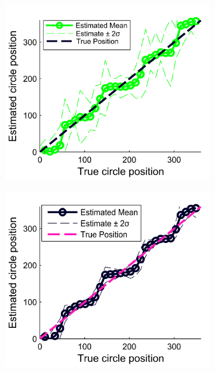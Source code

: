 \begin{figure}
\begin{subfigure}{7cm}
	\caption{}
	\label{Figure: circular_fusion_mean_5}	
	\end{subfigure}\\
	\begin{subfigure}{7cm}
	\includegraphics[scale=1]{line_circular_fusion_mean_10.png}
	\caption{}	
	\label{Figure: circular_fusion_mean_10}
	\end{subfigure}
	\begin{subfigure}{7cm}
	\includegraphics[scale=1]{line_circular_fusion_mean_40.png}

\end{subfigure}
\end{figure}
